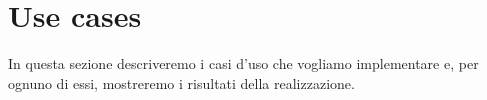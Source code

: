 \section{Use cases}
\label{section:use-cases}

In questa sezione descriveremo i casi d'uso che vogliamo implementare
e, per ognuno di essi, mostreremo i risultati della realizzazione.




